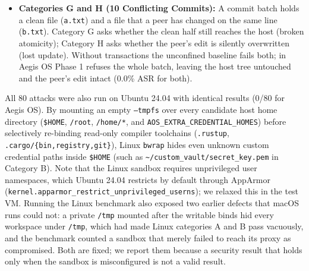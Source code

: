 \documentclass[10pt,twocolumn]{article}
\begin{document}
\begin{itemize}
    \item \textbf{Categories G and H (10 Conflicting Commits):} A commit batch holds a clean file (\texttt{a.txt}) and a file that a peer has changed on the same line (\texttt{b.txt}). Category G asks whether the clean half still reaches the host (broken atomicity); Category H asks whether the peer's edit is silently overwritten (lost update). Without transactions the unconfined baseline fails both; in Aegis OS Phase 1 refuses the whole batch, leaving the host tree untouched and the peer's edit intact (0.0\% ASR for both).
\end{itemize}

All 80 attacks were also run on Ubuntu 24.04 with identical results (0/80 for Aegis OS). By mounting an empty \texttt{--tmpfs} over every candidate host home directory (\texttt{\$HOME}, \texttt{/root}, \texttt{/home/*}, and \texttt{AOS\_EXTRA\_CREDENTIAL\_HOMES}) before selectively re-binding read-only compiler toolchains (\texttt{.rustup}, \texttt{.cargo/\{bin,registry,git\}}), Linux \texttt{bwrap} hides even unknown custom credential paths inside \texttt{\$HOME} (such as \texttt{\textasciitilde/custom\_vault/secret\_key.pem} in Category B). Note that the Linux sandbox requires unprivileged user namespaces, which Ubuntu 24.04 restricts by default through AppArmor (\texttt{kernel.apparmor\_restrict\_unprivileged\_userns}); we relaxed this in the test VM. Running the Linux benchmark also exposed two earlier defects that macOS runs could not: a private \texttt{/tmp} mounted after the writable binds hid every workspace under \texttt{/tmp}, which had made Linux categories A and B pass vacuously, and the benchmark counted a sandbox that merely failed to reach its proxy as compromised. Both are fixed; we report them because a security result that holds only when the sandbox is misconfigured is not a valid result.
\end{document}

